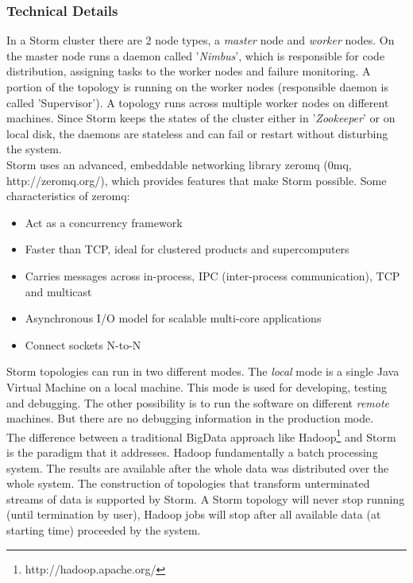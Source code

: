 \documentclass[a4paper]{article}
\begin{document}
\subsubsection{Technical Details}
In a Storm cluster there are 2 node types, a \textit{master} node and \textit{worker} nodes. On the master node runs a daemon called '\textit{Nimbus}', which is responsible for code distribution, assigning tasks to the worker nodes and failure monitoring. A portion of the topology is running on the worker nodes (responsible daemon is called 'Supervisor'). A topology runs across multiple worker nodes on different machines. Since Storm keeps the states of the cluster either in '\textit{Zookeeper}' or on local disk, the daemons are stateless and can fail or restart without disturbing the system.\\
Storm uses an advanced, embeddable networking library zeromq (0mq, http://zeromq.org/), which provides features that make Storm possible. Some characteristics of zeromq:
\begin{itemize}
	\item Act as a concurrency framework
	\item Faster than TCP, ideal for clustered products and supercomputers
	\item Carries messages across in-process, IPC (inter-process communication), TCP and multicast
	\item Asynchronous I/O model for scalable multi-core applications
	\item Connect sockets N-to-N 
\end{itemize}
Storm topologies can run in two different modes. The \textit{local} mode is a single Java Virtual Machine on a local machine. This mode is used for developing, testing and debugging. The other possibility is to run the software on different \textit{remote} machines. But there are no debugging information in the production mode.\\

The difference between a traditional BigData approach like Hadoop\footnote{http://hadoop.apache.org/} and Storm is the paradigm that it addresses. Hadoop fundamentally a batch processing system. The results are available after the whole data was distributed over the whole system. The construction of topologies that transform unterminated streams of data is supported by Storm. A Storm topology will never stop running (until termination by user), Hadoop jobs will stop after all available data (at starting time) proceeded by the system.
\end{document}
